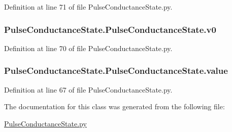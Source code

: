 Definition at line 71 of file Pulse\-Conductance\-State.\-py.

\hypertarget{class_pulse_conductance_state_1_1_pulse_conductance_state_a215539a3eb60e280225053c83f386d79}{
\subsubsection[{v0}]{\setlength{\rightskip}{0pt plus 5cm}Pulse\-Conductance\-State.\-Pulse\-Conductance\-State.\-v0}}\label{class_pulse_conductance_state_1_1_pulse_conductance_state_a215539a3eb60e280225053c83f386d79}


Definition at line 70 of file Pulse\-Conductance\-State.\-py.

\hypertarget{class_pulse_conductance_state_1_1_pulse_conductance_state_a832cdff7f315b8c16bef00642fb385dd}{
\subsubsection[{value}]{\setlength{\rightskip}{0pt plus 5cm}Pulse\-Conductance\-State.\-Pulse\-Conductance\-State.\-value}}\label{class_pulse_conductance_state_1_1_pulse_conductance_state_a832cdff7f315b8c16bef00642fb385dd}


Definition at line 67 of file Pulse\-Conductance\-State.\-py.



The documentation for this class was generated from the following file\-:\begin{DoxyCompactItemize}
\item 
\hyperlink{_pulse_conductance_state_8py}{Pulse\-Conductance\-State.\-py}\end{DoxyCompactItemize}
